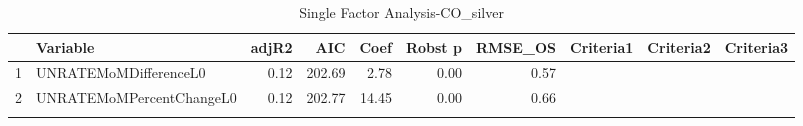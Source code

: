 \begin{longtable}{rlrrrrrlll}
  \hline
 & Variable & adjR2 & AIC & Coef & Robst p & RMSE\_OS & Criteria1 & Criteria2 & Criteria3 \\ 
  \hline
1 & UNRATEMoMDifferenceL0 & 0.12 & 202.69 & 2.78 & 0.00 & 0.57 &  &  &  \\ 
  2 & UNRATEMoMPercentChangeL0 & 0.12 & 202.77 & 14.45 & 0.00 & 0.66 &  &  &  \\ 
   \hline
\hline
\caption{Single Factor Analysis-CO_silver} 
\end{longtable}
